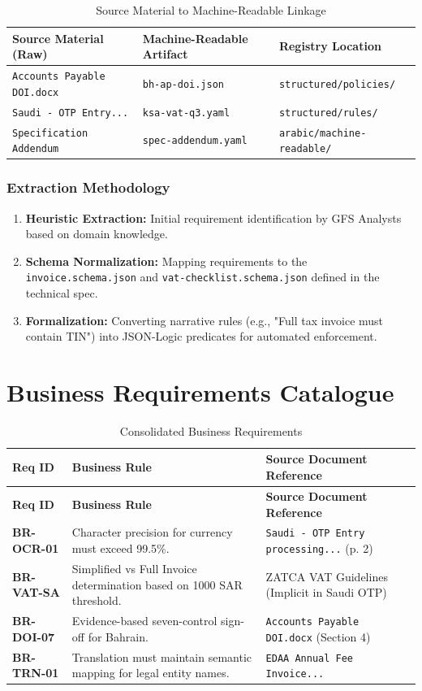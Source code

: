 \documentclass[11pt,a4paper,twoside]{report}
\begin{document}
\begin{table}[htbp]
\centering
\footnotesize
\caption{Source Material to Machine-Readable Linkage}
\label{tab:artifact-linkage}
\begin{tabularx}{\textwidth}{@{}l X X@{}}
\toprule
\textbf{Source Material (Raw)} & \textbf{Machine-Readable Artifact} & \textbf{Registry Location} \\
\midrule
\texttt{Accounts Payable DOI.docx} & \texttt{bh-ap-doi.json} & \texttt{structured/policies/} \\
\texttt{Saudi - OTP Entry...} & \texttt{ksa-vat-q3.yaml} & \texttt{structured/rules/} \\
\texttt{Specification Addendum} & \texttt{spec-addendum.yaml} & \texttt{arabic/machine-readable/} \\
\bottomrule
\end{tabularx}
\end{table}

\subsection{Extraction Methodology}
\begin{enumerate}
\item \textbf{Heuristic Extraction:} Initial requirement identification by GFS Analysts based on domain knowledge.
\item \textbf{Schema Normalization:} Mapping requirements to the \texttt{invoice.schema.json} and \texttt{vat-checklist.schema.json} defined in the technical spec.
\item \textbf{Formalization:} Converting narrative rules (e.g., "Full tax invoice must contain TIN") into JSON-Logic predicates for automated enforcement.
\end{enumerate}
\chapter{Business Requirements Catalogue}
\label{ch:requirements}

\begin{longtable}{p{2cm} p{5cm} p{7cm}}
\caption{Consolidated Business Requirements} \\
\toprule
\textbf{Req ID} & \textbf{Business Rule} & \textbf{Source Document Reference} \\
\midrule
\endfirsthead
\toprule
\textbf{Req ID} & \textbf{Business Rule} & \textbf{Source Document Reference} \\
\midrule
\endhead
\rowcolor{sapblue!5}
\textbf{BR-OCR-01} & Character precision for currency must exceed 99.5\%. & \texttt{Saudi - OTP Entry processing...} (p. 2) \\
\textbf{BR-VAT-SA} & Simplified vs Full Invoice determination based on 1000 SAR threshold. & ZATCA VAT Guidelines (Implicit in Saudi OTP) \\
\rowcolor{sapblue!5}
\textbf{BR-DOI-07} & Evidence-based seven-control sign-off for Bahrain. & \texttt{Accounts Payable DOI.docx} (Section 4) \\
\textbf{BR-TRN-01} & Translation must maintain semantic mapping for legal entity names. & \texttt{EDAA Annual Fee Invoice...} \\
\bottomrule
\end{longtable}
\end{document}
